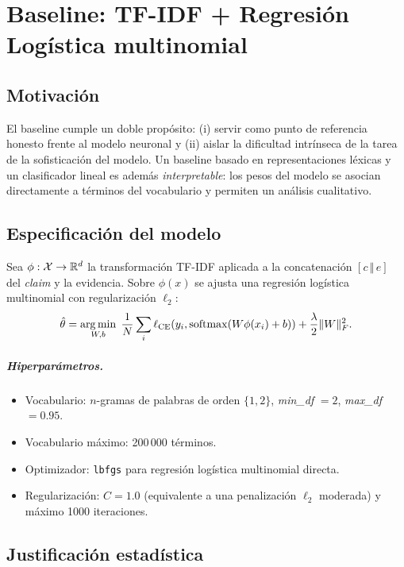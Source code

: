\chapter{Baseline: TF-IDF + Regresión Logística multinomial}\label{cap:baseline}

\section{Motivación}

El baseline cumple un doble propósito: (i) servir como punto de
referencia honesto frente al modelo neuronal y (ii) aislar la dificultad
intrínseca de la tarea de la sofisticación del modelo. Un baseline
basado en representaciones léxicas y un clasificador lineal es además
\emph{interpretable}: los pesos del modelo se asocian directamente a
términos del vocabulario y permiten un análisis cualitativo.

\section{Especificación del modelo}

Sea $\phi : \mathcal{X} \to \mathbb{R}^d$ la transformación TF-IDF aplicada a
la concatenación $[c\,\Vert\,e]$ del \emph{claim} y la evidencia. Sobre
$\phi(x)$ se ajusta una regresión logística multinomial con
regularización $\ell_2$:
\[
  \hat\theta = \operatorname*{arg\,min}_{W, b}\;
  \frac{1}{N} \sum_i \ell_{\text{CE}}(y_i, \operatorname{softmax}(W \phi(x_i) + b))
  + \frac{\lambda}{2} \lVert W \rVert_F^2.
\]

\paragraph{Hiperparámetros.}
\begin{itemize}[leftmargin=*,itemsep=0.2em]
  \item Vocabulario: $n$-gramas de palabras de orden $\{1, 2\}$,
        \emph{min\_df} $= 2$, \emph{max\_df} $= 0.95$.
  \item Vocabulario máximo: 200\,000 términos.
    \item Optimizador: \texttt{lbfgs} para regresión logística
      multinomial directa.
    \item Regularización: $C = 1.0$ (equivalente a una penalización
      $\ell_2$ moderada) y máximo 1000 iteraciones.
\end{itemize}

\section{Justificación estadística}

